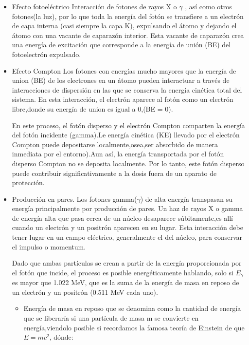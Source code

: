 \documentclass[12pt,fleqn]{book} %
\numberwithin{equation}{section} %
\numberwithin{figure}{section} %
\numberwithin{table}{section} %
\begin{document}
{\begin{itemize}
\item Efecto fotoeléctrico
Interacción de fotones de rayos X o $\gamma$ , así como otros fotones(la luz), por lo que toda la energía del fotón se transfiere a un electrón de capa interna (casi siempre la capa K), expulsando el átomo y dejando el átomo con una vacante de caparazón interior. Esta vacante de caparazón crea una energía de excitación que corresponde a la energía de unión (BE) del fotoelectrón expulsado.

\item Efecto Compton 
Los fotones con energías mucho mayores que la energía de union (BE) de los electrones en un átomo pueden interactuar a través de interacciones de dispersión en las que se conserva la energía cinética %
total del sistema. En esta interacción, el electrón aparece al fotón como un electrón libre,donde su energía  de union es igual a 0,(BE = 0).

En este proceso, el fotón disperso y el electrón Compton comparten la energía del fotón incidente (gamma).Le energía cinética (KE) llevado por el electrón Compton puede depositarse localmente,osea,ser absorbido de manera inmediata por el entorno).Aun así, la energía transportada por el fotón disperso Compton no se deposita localmente. Por lo tanto, este fotón disperso puede contribuir significativamente a la dosis fuera de un aparato de protección.

\item Producción en pares.
Los fotones gamma($\gamma$) de alta energía transpasan su energía principalmente por producción de pares. Un haz de rayos X o gamma de energía  alta que pasa cerca de un núcleo desaparece 
súbitamente,es allí cuando un electrón y un positrón aparecen en su lugar. Esta interacción debe tener lugar en un campo eléctrico, generalmente el del núcleo, para conservar el impulso o momentum.

Dado que ambas partículas se crean a partir de la energía proporcionada por el fotón que incide, el proceso es posible energéticamente hablando, solo si $E_{\gamma}$es mayor que 1.022 MeV, que es la suma de la energía de masa en reposo de un electrón y un positrón (0.511 MeV cada uno).

\begin{itemize}
\item  Energía de masa en reposo que se denomina como la cantidad de energía que se liberaría si una partícula de masa m se convierte en energía,viendolo posible si recordamos la famosa teoría de Einstein de que $E = mc^{2}$,
dónde:


\end{itemize}
\end{itemize}}
\end{document}
